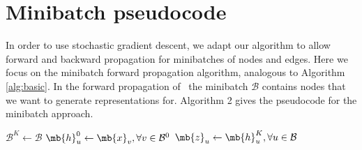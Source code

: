 \section{Minibatch pseudocode}\label{inductive:sec:minibatch}

In order to use stochastic gradient descent, we adapt our algorithm to allow forward and backward
propagation for minibatches of nodes and edges. 
Here we focus on the minibatch forward propagation
algorithm, analogous to Algorithm \ref{alg:basic}.
In the forward propagation of \name\, the minibatch $\mathcal{B}$ contains nodes that we want to generate representations for. 
Algorithm 2 gives the pseudocode for the minibatch approach. 

\setcounter{algocf}{1}
\begin{algorithm}
\caption{\name\ minibatch forward propagation algorithm}
    \BlankLine
         $\mathcal{B}^K \leftarrow \mathcal{B}$\;
        $\mb{h}^0_u \leftarrow \mb{x}_v, \forall v \in \mathcal{B}^0$ \;
     $\mb{z}_u\leftarrow \mb{h}^{K}_u, \forall u \in \mathcal{B}$ 
\end{algorithm}

